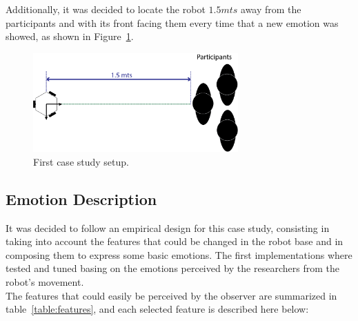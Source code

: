 Additionally, it was decided to locate the robot $1.5 mts$ away from the participants and with its front facing them every time that a new emotion was showed, as shown in  Figure~\ref{fig:setup}. 

\begin{figure}[h]
	\centering
	\includegraphics[width=0.7\textwidth]{./Images/FirstCase.png} 
	\caption{First case study setup.}
	\label{fig:setup}
\end{figure}  


\subsection{Emotion Description}

It was decided to follow an empirical design for this case study, consisting in taking into account the features that could be changed in the robot base and in composing them to express some basic emotions. The first implementations where tested and tuned basing on the emotions perceived by the researchers from the robot's movement.\\
The features that could easily be perceived by the observer are summarized in table~\ref{table:features}, and each selected feature is described here below:

